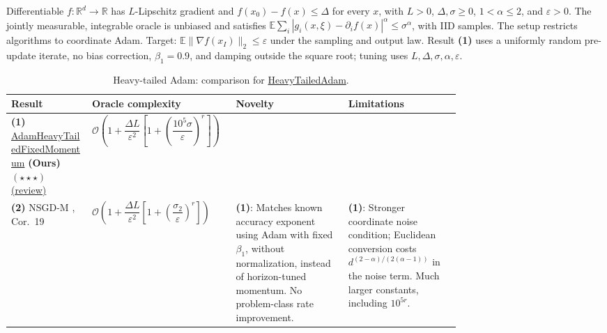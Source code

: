\begin{table}[tp]
\centering
\caption{Heavy-tailed Adam: comparison for \href{https://github.com/k3nfalt/longtails/blob/main/LongTails/Setups/HeavyTailedAdam.lean}{HeavyTailedAdam}.}\label{tab:HeavyTailedAdam}
\parbox{\linewidth}{\footnotesize Differentiable $f:\mathbb{R}^d\to\mathbb{R}$ has $L$-Lipschitz gradient and $f(x_0)-f(x)\leq\Delta$ for every $x$, with $L>0$, $\Delta,\sigma\geq0$, $1<\alpha\leq2$, and $\varepsilon>0$. The jointly measurable, integrable oracle is unbiased and satisfies $\mathbb{E}\sum_i|g_i(x,\xi)-\partial_i f(x)|^\alpha\leq\sigma^\alpha$, with IID samples. The setup restricts algorithms to coordinate Adam. Target: $\mathbb{E}\|\nabla f(x_I)\|_2\leq\varepsilon$ under the sampling and output law. Result \textbf{(1)} uses a uniformly random pre-update iterate, no bias correction, $\beta_1=0.9$, and damping outside the square root; tuning uses $L,\Delta,\sigma,\alpha,\varepsilon$.}\par\smallskip
\begin{threeparttable}
\footnotesize
\setlength{\tabcolsep}{4pt}\renewcommand{\arraystretch}{1.25}
\begin{tabularx}{\linewidth}{@{}>{\raggedright\arraybackslash}p{0.18\linewidth}>{\raggedright\arraybackslash}p{0.32\linewidth}>{\raggedright\arraybackslash}p{0.25\linewidth}>{\raggedright\arraybackslash}X@{}}
\toprule
\textbf{Result} & \textbf{Oracle complexity} & \textbf{Novelty} & \textbf{Limitations} \\
\midrule
\textbf{(1)} \href{https://github.com/k3nfalt/longtails/blob/main/LongTails/Theorems/AdamHeavyTailedFixedMomentum.lean}{Adam\allowbreak Heavy\allowbreak Tailed\allowbreak Fixed\allowbreak Momentum} \textbf{(Ours)} $(\star\star\star)$ \href{https://github.com/k3nfalt/longtails/blob/main/scripts/reviews/AdamHeavyTailedFixedMomentum.md}{(review)}
& $\mathcal{O}\!\left(1+\dfrac{\Delta L}{\varepsilon^2}\left[1+\left(\dfrac{10^5\sigma}{\varepsilon}\right)^r\right]\right)$ & & \\
\midrule[1.2pt]
\textbf{(2)} NSGD-M \citep{htaHubler2025v3}, Cor.~19
& $\mathcal{O}\!\left(1+\dfrac{\Delta L}{\varepsilon^2}\left[1+\left(\dfrac{\sigma_2}{\varepsilon}\right)^r\right]\right)$
& \textbf{(1)}: Matches known accuracy exponent using Adam with fixed $\beta_1$, without normalization, instead of horizon-tuned momentum. No problem-class rate improvement.
& \textbf{(1)}: Stronger coordinate noise condition; Euclidean conversion costs $d^{(2-\alpha)/(2(\alpha-1))}$ in the noise term. Much larger constants, including $10^{5r}$. \\

\end{tabularx}
\end{threeparttable}
\end{table}
